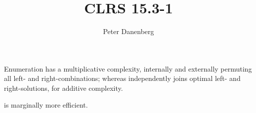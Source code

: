 \documentclass{article}
\title{CLRS 15.3-1}
\author{Peter Danenberg}
\begin{document}
\maketitle

Enumeration has a multiplicative complexity, internally and externally
permuting all left- and right-combinations; whereas
 independently joins optimal left- and
right-solutions, for additive complexity.

 is marginally more efficient.
\end{document}
